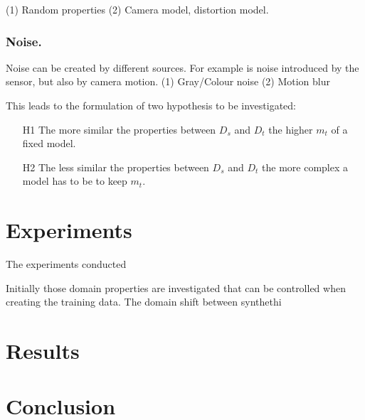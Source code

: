 	(1) Random properties (2) Camera model, distortion model.
	
\subsubsection{Noise.} Noise can be created by different sources. For example is noise introduced by the sensor, but also by camera motion.
	(1) Gray/Colour noise (2) Motion blur

This leads to the formulation of two hypothesis to be investigated:

\begin{enumerate}
	\item[H1] The more similar the properties between $D_s$ and $D_t$ the higher $m_t$ of a fixed model.
	\item[H2] The less similar the properties between $D_s$ and $D_t$ the more complex a model has to be to keep $m_t$.
\end{enumerate}



\section{Experiments}
\label{sec:training:experiments}

The experiments conducted

Initially those domain properties are investigated that can be controlled when creating the training data. The domain shift between synthethi







\section{Results}
\label{sec:training:results}

\section{Conclusion}
\label{sec:training:conclusion}

%
